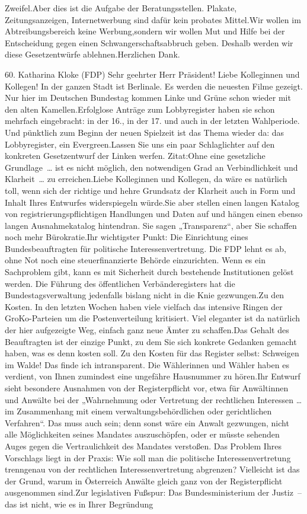 \documentclass{article}
\begin{document}
Zweifel.Aber dies ist die Aufgabe der Beratungsstellen. Plakate, Zeitungsanzeigen, Internetwerbung sind dafür kein probates Mittel.Wir wollen im Abtreibungsbereich keine Werbung,sondern wir wollen Mut und Hilfe bei der Entscheidung gegen einen Schwangerschaftsabbruch geben. Deshalb werden wir diese Gesetzentwürfe ablehnen.Herzlichen Dank.




	60. Katharina Kloke (FDP) Sehr geehrter Herr Präsident! Liebe Kolleginnen und Kollegen! In der ganzen Stadt ist Berlinale. Es werden die neuesten Filme gezeigt. Nur hier im Deutschen Bundestag kommen Linke und Grüne schon wieder mit den alten Kamellen.Erfolglose Anträge zum Lobbyregister haben sie schon mehrfach eingebracht: in der 16., in der 17. und auch in der letzten Wahlperiode. Und pünktlich zum Beginn der neuen Spielzeit ist das Thema wieder da: das Lobbyregister, ein Evergreen.Lassen Sie uns ein paar Schlaglichter auf den konkreten Gesetzentwurf der Linken werfen. Zitat:Ohne eine gesetzliche Grundlage … ist es nicht möglich, den notwendigen Grad an Verbindlichkeit und Klarheit … zu erreichen.Liebe Kolleginnen und Kollegen, da wäre es natürlich toll, wenn sich der richtige und hehre Grundsatz der Klarheit auch in Form und Inhalt Ihres Entwurfes widerspiegeln würde.Sie aber stellen einen langen Katalog von registrierungspflichtigen Handlungen und Daten auf und hängen einen ebenso langen Ausnahmekatalog hintendran. Sie sagen „Transparenz“, aber Sie schaffen noch mehr Bürokratie.Ihr wichtigster Punkt: Die Einrichtung eines Bundesbeauftragten für politische Interessenvertretung. Die FDP lehnt es ab, ohne Not noch eine steuerfinanzierte Behörde einzurichten. Wenn es ein Sachproblem gibt, kann es mit Sicherheit durch bestehende Institutionen gelöst werden. Die Führung des öffentlichen Verbänderegisters hat die Bundestagsverwaltung jedenfalls bislang nicht in die Knie gezwungen.Zu den Kosten. In den letzten Wochen haben viele vielfach das intensive Ringen der GroKo-Parteien um die Postenverteilung kritisiert. Viel eleganter ist da natürlich der hier aufgezeigte Weg, einfach ganz neue Ämter zu schaffen.Das Gehalt des Beauftragten ist der einzige Punkt, zu dem Sie sich konkrete Gedanken gemacht haben, was es denn kosten soll. Zu den Kosten für das Register selbst: Schweigen im Walde! Das finde ich intransparent. Die Wählerinnen und Wähler haben es verdient, von Ihnen zumindest eine ungefähre Hausnummer zu hören.Ihr Entwurf sieht besondere Ausnahmen von der Registerpflicht vor, etwa für Anwältinnen und Anwälte bei der „Wahrnehmung oder Vertretung der rechtlichen Interessen … im Zusammenhang mit einem verwaltungsbehördlichen oder gerichtlichen Verfahren“. Das muss auch sein; denn sonst wäre ein Anwalt gezwungen, nicht alle Möglichkeiten seines Mandates auszuschöpfen, oder er müsste sehenden Auges gegen die Vertraulichkeit des Mandates verstoßen. Das Problem Ihres Vorschlags liegt in der Praxis: Wie soll man die politische Interessenvertretung trenngenau von der rechtlichen Interessenvertretung abgrenzen? Vielleicht ist das der Grund, warum in Österreich Anwälte gleich ganz von der Registerpflicht ausgenommen sind.Zur legislativen Fußspur: Das Bundesministerium der Justiz – das ist nicht, wie es in Ihrer Begründung 
\end{document}
